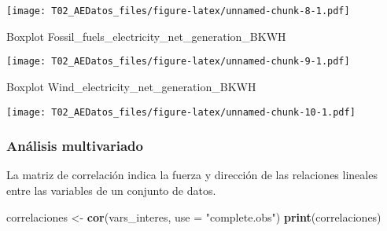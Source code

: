 \documentclass[
]{article}
\newenvironment{Shaded}{\begin{snugshade}}{\end{snugshade}}
\newcommand{\AttributeTok}[1]{\textcolor[rgb]{0.13,0.29,0.53}{#1}}
\newcommand{\FunctionTok}[1]{\textcolor[rgb]{0.13,0.29,0.53}{\textbf{#1}}}
\newcommand{\NormalTok}[1]{#1}
\newcommand{\OtherTok}[1]{\textcolor[rgb]{0.56,0.35,0.01}{#1}}
\newcommand{\SpecialCharTok}[1]{\textcolor[rgb]{0.81,0.36,0.00}{\textbf{#1}}}
\newcommand{\StringTok}[1]{\textcolor[rgb]{0.31,0.60,0.02}{#1}}
\begin{document}
\texttt{[image: T02\_AEDatos\_files/figure-latex/unnamed-chunk-8-1.pdf]}

Boxplot Fossil\_fuels\_electricity\_net\_generation\_BKWH

\begin{Shaded}
\end{Shaded}

\texttt{[image: T02\_AEDatos\_files/figure-latex/unnamed-chunk-9-1.pdf]}

Boxplot Wind\_electricity\_net\_generation\_BKWH

\begin{Shaded}
\end{Shaded}

\texttt{[image: T02\_AEDatos\_files/figure-latex/unnamed-chunk-10-1.pdf]}

\subsubsection{Análisis multivariado}\label{anuxe1lisis-multivariado}

La matriz de correlación indica la fuerza y dirección de las relaciones
lineales entre las variables de un conjunto de datos.

\begin{Shaded}
\begin{Highlighting}[]
\NormalTok{correlaciones }\OtherTok{\textless{}{-}} \FunctionTok{cor}\NormalTok{(vars\_interes, }\AttributeTok{use =} \StringTok{"complete.obs"}\NormalTok{)}
\FunctionTok{print}\NormalTok{(correlaciones)}
\end{Highlighting}
\end{Shaded}
\end{document}
